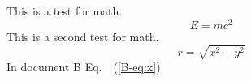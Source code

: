 \documentclass{article}
\begin{document}
    This is a test for math.
    \begin{equation}
        E=mc^2 \label{eq:1}
    \end{equation}
    This is a second test for math.
    \begin{equation}
        r = \sqrt{x^2 + y^2} \label{eq:2}
    \end{equation}
    In document B Eq.~~(\ref{B-eq:x}) 
\end{document}
